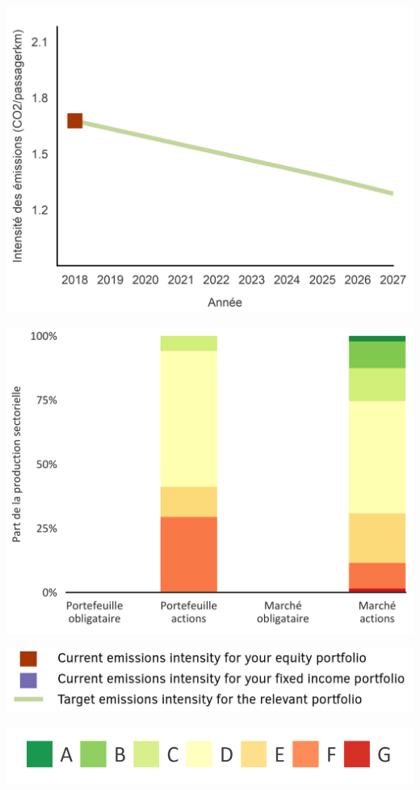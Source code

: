 \documentclass[10pt,table]{article}\usepackage[]{graphicx}\usepackage[]{color}
\begin{document}
	\begin{multicols}{2}

		\includegraphics[trim = {0 0 0 0pt}, width=.9\linewidth]{ReportOutputs/Fig32}  \vfill\null \columnbreak

		\includegraphics[width=1\linewidth]{ReportOutputs/Fig33}

	\end{multicols}

	\vspace{0pt}
	\setlength\multicolsep{0pt}

	\begin{multicols}{2}
		\includegraphics[width=1\linewidth]{ReportGraphics/OtherSectorLegend}


		\begin{center}
			\includegraphics[width=0.6\linewidth]{ReportGraphics/ShippingLegend}
		\end{center}	

	\end{multicols}
\end{document}
